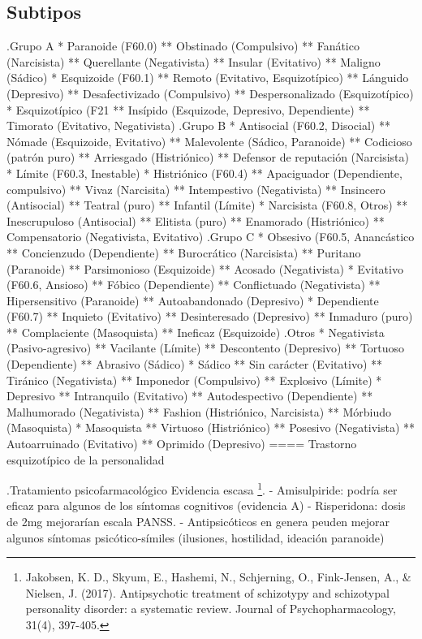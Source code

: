 \documentclass{scrbook}
\begin{document}
\subsection*{Subtipos}
.Grupo A
* Paranoide (F60.0)
** Obstinado (Compulsivo)
** Fanático (Narcisista)
** Querellante (Negativista)
** Insular (Evitativo)
** Maligno (Sádico)
* Esquizoide (F60.1)
** Remoto (Evitativo, Esquizotípico)
** Lánguido (Depresivo)
** Desafectivizado (Compulsivo)
** Despersonalizado (Esquizotípico)
* Esquizotípico (F21
** Insípido (Esquizode, Depresivo, Dependiente)
** Timorato (Evitativo, Negativista)
.Grupo B
* Antisocial (F60.2, Disocial)
** Nómade (Esquizoide, Evitativo)
** Malevolente (Sádico, Paranoide)
** Codicioso (patrón puro)
** Arriesgado (Histriónico)
** Defensor de reputación (Narcisista)
* Límite (F60.3, Inestable)
* Histriónico (F60.4)
** Apaciguador (Dependiente, compulsivo)
** Vivaz (Narcisita)
** Intempestivo (Negativista)
** Insincero (Antisocial)
** Teatral (puro)
** Infantil (Límite)
* Narcisista (F60.8, Otros)
** Inescrupuloso (Antisocial)
** Elitista (puro)
** Enamorado (Histriónico)
** Compensatorio (Negativista, Evitativo)
.Grupo C
* Obsesivo (F60.5, Anancástico
** Concienzudo (Dependiente)
** Burocrático (Narcisista)
** Puritano (Paranoide)
** Parsimonioso (Esquizoide)
** Acosado (Negativista)
* Evitativo (F60.6, Ansioso)
** Fóbico (Dependiente)
** Conflictuado (Negativista)
** Hipersensitivo (Paranoide)
** Autoabandonado (Depresivo)
* Dependiente (F60.7)
** Inquieto (Evitativo)
** Desinteresado (Depresivo)
** Inmaduro (puro)
** Complaciente (Masoquista)
** Ineficaz (Esquizoide)
.Otros
* Negativista (Pasivo-agresivo)
** Vacilante (Límite)
** Descontento (Depresivo)
** Tortuoso (Dependiente)
** Abrasivo (Sádico)
* Sádico
** Sin carácter (Evitativo)
** Tiránico (Negativista)
** Imponedor (Compulsivo)
** Explosivo (Límite)
* Depresivo
** Intranquilo (Evitativo)
** Autodespectivo (Dependiente)
** Malhumorado (Negativista)
** Fashion (Histriónico, Narcisista)
** Mórbiudo (Masoquista)
* Masoquista
** Virtuoso (Histriónico)
** Posesivo (Negativista)
** Autoarruinado (Evitativo)
** Oprimido (Depresivo)
==== Trastorno esquizotípico de la personalidad

.Tratamiento psicofarmacológico
Evidencia escasa \footnote{Jakobsen, K. D., Skyum, E., Hashemi, N., Schjerning, O., Fink-Jensen, A., \& Nielsen, J. (2017). Antipsychotic treatment of schizotypy and schizotypal personality disorder: a systematic review. Journal of Psychopharmacology, 31(4), 397-405.}.
- Amisulpiride: podría ser eficaz para algunos de los síntomas cognitivos (evidencia A)
- Risperidona: dosis de 2mg mejorarían escala PANSS.
- Antipsicóticos en genera peuden mejorar algunos síntomas psicótico-símiles (ilusiones, hostilidad, ideación paranoide)
\end{document}
